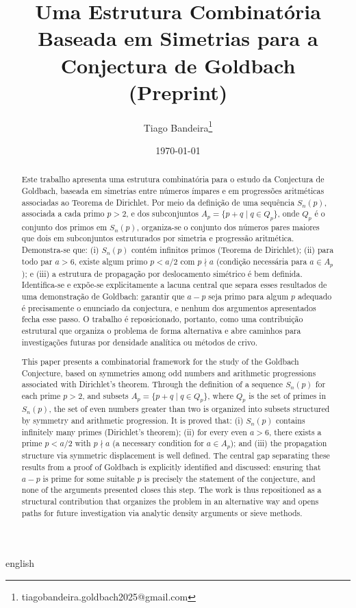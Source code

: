 \documentclass[a4paper,11pt]{article}
\title{\textbf{Uma Estrutura Combinatória Baseada em Simetrias para a
		Conjectura de Goldbach}\\
	\large (Preprint)}
\author{
	Tiago Bandeira\thanks{tiagobandeira.goldbach2025@gmail.com}
}
\date{\today}
\theoremstyle{definition}
\theoremstyle{remark}
\begin{document}
	
	\maketitle
	
	\begin{otherlanguage*}{english}
		\begin{abstract}
			Este trabalho apresenta uma estrutura combinatória para o estudo da
			Conjectura de Goldbach, baseada em simetrias entre números ímpares e em
			progressões aritméticas associadas ao Teorema de Dirichlet. Por meio da
			definição de uma sequência \(S_n(p)\), associada a cada primo \(p > 2\), e
			dos subconjuntos \(A_p = \{p + q \mid q \in Q_p\}\), onde \(Q_p\) é o
			conjunto dos primos em \(S_n(p)\), organiza-se o conjunto dos números pares
			maiores que dois em subconjuntos estruturados por simetria e progressão
			aritmética. Demonstra-se que: (i) \(S_n(p)\) contém infinitos primos
			(Teorema de Dirichlet); (ii) para todo par \(a > 6\), existe algum primo
			\(p < a/2\) com \(p \nmid a\) (condição necessária para \(a \in A_p\)); e
			(iii) a estrutura de propagação por deslocamento simétrico é bem definida.
			Identifica-se e expõe-se explicitamente a lacuna central que separa esses
			resultados de uma demonstração de Goldbach: garantir que \(a - p\) seja
			primo para algum \(p\) adequado é precisamente o enunciado da conjectura,
			e nenhum dos argumentos apresentados fecha esse passo. O trabalho é
			reposicionado, portanto, como uma contribuição estrutural que organiza o
			problema de forma alternativa e abre caminhos para investigações futuras
			por densidade analítica ou métodos de crivo.
		\end{abstract}
	\end{otherlanguage*}
	
	\begin{abstract}
		This paper presents a combinatorial framework for the study of the Goldbach
		Conjecture, based on symmetries among odd numbers and arithmetic progressions
		associated with Dirichlet's theorem. Through the definition of a sequence
		\(S_n(p)\) for each prime \(p > 2\), and subsets \(A_p = \{p + q \mid q
		\in Q_p\}\), where \(Q_p\) is the set of primes in \(S_n(p)\), the set of
		even numbers greater than two is organized into subsets structured by
		symmetry and arithmetic progression. It is proved that: (i) \(S_n(p)\)
		contains infinitely many primes (Dirichlet's theorem); (ii) for every even
		\(a > 6\), there exists a prime \(p < a/2\) with \(p \nmid a\) (a necessary
		condition for \(a \in A_p\)); and (iii) the propagation structure via
		symmetric displacement is well defined. The central gap separating these
		results from a proof of Goldbach is explicitly identified and discussed:
		ensuring that \(a - p\) is prime for some suitable \(p\) is precisely the
		statement of the conjecture, and none of the arguments presented closes
		this step. The work is thus repositioned as a structural contribution that
		organizes the problem in an alternative way and opens paths for future
		investigation via analytic density arguments or sieve methods.
	\end{abstract}
	
\end{document}
